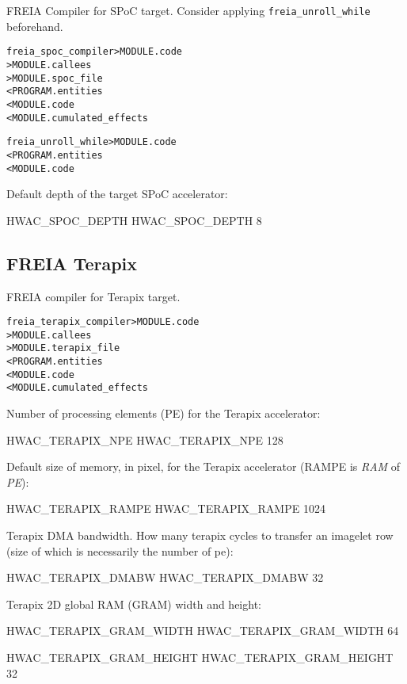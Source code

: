 \documentclass[a4paper]{report}
\newenvironment{PipsMake}{\begin{alltt}}{\end{alltt}}
\begin{document}
FREIA Compiler for SPoC target.
Consider applying  \verb|freia_unroll_while| beforehand.

\begin{PipsMake}
freia_spoc_compiler   > MODULE.code
                      > MODULE.callees
                      > MODULE.spoc_file
        < PROGRAM.entities
        < MODULE.code
        < MODULE.cumulated_effects

freia_unroll_while	> MODULE.code
        < PROGRAM.entities
        < MODULE.code
\end{PipsMake}

Default depth of the target SPoC accelerator:
\begin{PipsProp}{HWAC_SPOC_DEPTH}
HWAC_SPOC_DEPTH 8
\end{PipsProp}

\subsection{FREIA Terapix}
\label{hwac-freia-terapix}

FREIA compiler for Terapix target.

\begin{PipsMake}
freia_terapix_compiler  > MODULE.code
                        > MODULE.callees
                        > MODULE.terapix_file
        < PROGRAM.entities
        < MODULE.code
        < MODULE.cumulated_effects
\end{PipsMake}

Number of processing elements (PE) for the Terapix accelerator:
\begin{PipsProp}{HWAC_TERAPIX_NPE}
HWAC_TERAPIX_NPE 128
\end{PipsProp}

Default size of memory, in pixel, for the Terapix accelerator
(RAMPE is \emph{RAM} of \emph{PE}):
\begin{PipsProp}{HWAC_TERAPIX_RAMPE}
HWAC_TERAPIX_RAMPE 1024
\end{PipsProp}

Terapix DMA bandwidth. How many terapix cycles to transfer an imagelet row
(size of which is necessarily the number of pe):
\begin{PipsProp}{HWAC_TERAPIX_DMABW}
HWAC_TERAPIX_DMABW 32
\end{PipsProp}

Terapix 2D global RAM (GRAM) width and height:
\begin{PipsProp}{HWAC_TERAPIX_GRAM_WIDTH}
HWAC_TERAPIX_GRAM_WIDTH 64
\end{PipsProp}
\begin{PipsProp}{HWAC_TERAPIX_GRAM_HEIGHT}
HWAC_TERAPIX_GRAM_HEIGHT 32
\end{PipsProp}
\end{document}
